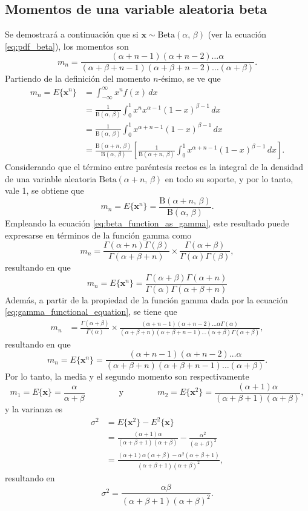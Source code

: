 \documentclass[a4paper]{report}
\newcommand{\x}{\mathbf{x}}
\begin{document}
\subsection{Momentos de una variable aleatoria beta}\label{sec:beta_rv_moments}

Se demostrará a continuación que si \(\x\sim\mathrm{Beta}(\alpha,\,\beta)\) (ver la ecuación \ref{eq:pdf_beta}), los momentos son \cite{panchenko03lec8}
\[
 m_n=\frac{(\alpha+n-1)(\alpha+n-2)\dots\alpha}{(\alpha+\beta+n-1)(\alpha+\beta+n-2)\dots(\alpha+\beta)}.
\]
Partiendo de la definición del momento \(n\)-ésimo, se ve que 
\begin{align*}
 m_n=E\{\x^n\}&=\int_{-\infty}^{\infty}x^nf(x)\,dx\\
  &=\frac{1}{\mathrm{B}(\alpha,\,\beta)}\int_{0}^{1}x^nx^{\alpha-1}(1-x)^{\beta-1}\,dx\\
  &=\frac{1}{\mathrm{B}(\alpha,\,\beta)}\int_{0}^{1}x^{\alpha+n-1}(1-x)^{\beta-1}\,dx\\
  &=\frac{\mathrm{B}(\alpha+n,\,\beta)}{\mathrm{B}(\alpha,\,\beta)}\left[\frac{1}{\mathrm{B}(\alpha+n,\,\beta)}\int_{0}^{1}x^{\alpha+n-1}(1-x)^{\beta-1}\,dx\right].
\end{align*}
Considerando que el término entre paréntesis rectos es la integral de la densidad de una variable aleatoria \(\mathrm{Beta}(\alpha+n,\,\beta)\) en todo su soporte, y por lo tanto, vale 1, se obtiene que
\[
 m_n=E\{\x^n\}=\frac{\mathrm{B}(\alpha+n,\,\beta)}{\mathrm{B}(\alpha,\,\beta)}.
\]
Empleando la ecuación \ref{eq:beta_function_as_gamma}, este resultado puede expresarse en términos de la función gamma como
\[
 m_n=\frac{\Gamma(\alpha+n)\Gamma(\beta)}{\Gamma(\alpha+\beta+n)}\times\frac{\Gamma(\alpha+\beta)}{\Gamma(\alpha)\Gamma(\beta)},
\]
resultando en que
\[
 m_n=E\{\x^n\}=\frac{\Gamma(\alpha+\beta)\Gamma(\alpha+n)}{\Gamma(\alpha)\Gamma(\alpha+\beta+n)}
\]
Además, a partir de la propiedad de la función gamma dada por la ecuación 
\ref{eq:gamma_functional_equation}, se tiene que 
\begin{align*}
 m_n&=\frac{\Gamma(\alpha+\beta)}{\Gamma(\alpha)}\times\frac{(\alpha+n-1)(\alpha+n-2)\dots\alpha\Gamma(\alpha)}{(\alpha+\beta+n)(\alpha+\beta+n-1)\dots(\alpha+\beta)\Gamma(\alpha+\beta)},
\end{align*}
resultando en que 
\[
 m_n=E\{\x^n\}=\frac{(\alpha+n-1)(\alpha+n-2)\dots\alpha}{(\alpha+\beta+n)(\alpha+\beta+n-1)\dots(\alpha+\beta)}.
\]
Por lo tanto, la media y el segundo momento son respectivamente
\[
 m_1=E\{\x\}=\frac{\alpha}{\alpha+\beta}
  \qquad\qquad\textrm{y}\qquad\qquad
 m_2=E\{\x^2\}=\frac{(\alpha+1)\alpha}{(\alpha+\beta+1)(\alpha+\beta)}, 
\]
y la varianza es
\begin{align*}
 \sigma^2&=E\{\x^2\}-E^2\{\x\}\\
  &=\frac{(\alpha+1)\alpha}{(\alpha+\beta+1)(\alpha+\beta)}-\frac{\alpha^2}{(\alpha+\beta)^2}\\
  &=\frac{(\alpha+1)\alpha(\alpha+\beta)-\alpha^2(\alpha+\beta+1)}{(\alpha+\beta+1)(\alpha+\beta)^2},
\end{align*}
resultando en
\[
 \sigma^2=\frac{\alpha\beta}{(\alpha+\beta+1)(\alpha+\beta)^2}.
\]
\end{document}
